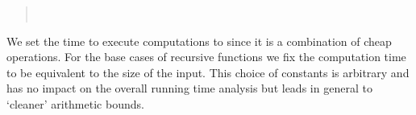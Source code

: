 \begin{isabellebody}
\begin{isamarkuptext}
\begin{quote}
 \vskip 0pt
 \vskip 0pt
 \vskip 0pt
 \vskip 0pt
 \vskip 0pt
\  \vskip 0pt
\ \qquad{} \vskip 0pt
\ \quad\qquad{}
\end{quote}
We set the time to execute  computations to  since it is a combination
of cheap operations. For the base cases of recursive functions
we fix the computation time to be equivalent to the size of the input. This choice of constants is arbitrary and has no
impact on the overall running time analysis but leads in general to `cleaner' arithmetic bounds.


\end{isamarkuptext}
\end{isabellebody}
